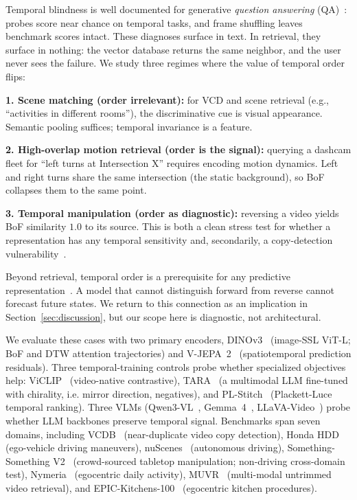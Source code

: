 \documentclass{article}
\theoremstyle{remark}
\begin{document}
Temporal blindness is well documented for generative \emph{question answering} (QA)~\cite{tomato,temporalbench,tempcompass,infact,videozerobench,vbenchcomp}: probes score near chance on temporal tasks, and frame shuffling leaves benchmark scores intact. These diagnoses surface in text. In retrieval, they surface in nothing: the vector database returns the same neighbor, and the user never sees the failure. We study three regimes where the value of temporal order flips:

\textbf{1. Scene matching (order irrelevant):} for VCD and scene retrieval (e.g., ``activities in different rooms''), the discriminative cue is visual appearance. Semantic pooling suffices; temporal invariance is a feature.

\textbf{2. High-overlap motion retrieval (order is the signal):} querying a dashcam fleet for ``left turns at Intersection X'' requires encoding motion dynamics. Left and right turns share the same intersection (the static background), so BoF collapses them to the same point.

\textbf{3. Temporal manipulation (order as diagnostic):} reversing a video yields BoF similarity $1.0$ to its source. This is both a clean stress test for whether a representation has any temporal sensitivity and, secondarily, a copy-detection vulnerability~\cite{fojcik2025}.

Beyond retrieval, temporal order is a prerequisite for any predictive representation~\cite{lecun_worldmodel}. A model that cannot distinguish forward from reverse cannot forecast future states. We return to this connection as an implication in Section~\ref{sec:discussion}, but our scope here is diagnostic, not architectural.

We evaluate these cases with two primary encoders, DINOv3~\cite{dinov3} (image-SSL ViT-L; BoF and DTW attention trajectories) and V-JEPA~2~\cite{vjepa2} (spatiotemporal prediction residuals). Three temporal-training controls probe whether specialized objectives help: ViCLIP~\cite{viclip} (video-native contrastive), TARA~\cite{tara} (a multimodal LLM fine-tuned with chirality, i.e. mirror direction, negatives), and PL-Stitch~\cite{plstitch} (Plackett-Luce temporal ranking). Three VLMs (Qwen3-VL~\cite{qwen3vl}, Gemma~4~\cite{gemma4}, LLaVA-Video~\cite{llavavideo}) probe whether LLM backbones preserve temporal signal. Benchmarks span seven domains, including VCDB~\cite{vcdb} (near-duplicate video copy detection), Honda HDD~\cite{honda_hdd} (ego-vehicle driving maneuvers), nuScenes~\cite{nuscenes} (autonomous driving), Something-Something V2~\cite{ssv2} (crowd-sourced tabletop manipulation; non-driving cross-domain test), Nymeria~\cite{nymeria} (egocentric daily activity), MUVR~\cite{muvr} (multi-modal untrimmed video retrieval), and EPIC-Kitchens-100~\cite{epickitchens} (egocentric kitchen procedures).
\end{document}
